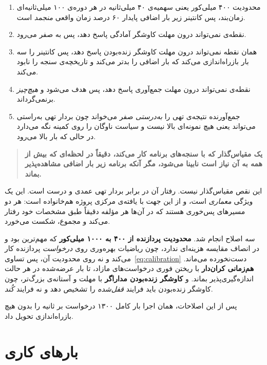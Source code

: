 \begin{enumerate}
  \item محدودیت ۴۰۰ میلی‌کور یعنی سهمیه‌ی ۴۰ میلی‌ثانیه در هر دوره‌ی ۱۰۰ میلی‌ثانیه‌ای
  زمان‌بند، پس کانتینر زیر بار اضافی پایدار ۶۰ درصد زمان واقعی \emph{منجمد} است.
  \item نقطه‌ی  نمی‌تواند درون مهلت کاوشگر آمادگی پاسخ دهد، پس
   به صفر می‌رود.
  \item همان نقطه نمی‌تواند درون مهلت کاوشگر زنده‌بودن پاسخ دهد، پس  کانتینر را
  سه بار بازراه‌اندازی می‌کند \mdash{} که بار اضافی را بدتر می‌کند و تاریخچه‌ی سنجه را نابود می‌کند.
  \item نقطه‌ی  نمی‌تواند درون مهلت جمع‌آوری پاسخ دهد، پس هدف  می‌شود و
   \emph{هیچ‌چیز} برنمی‌گرداند.
  \item جمع‌آورنده نتیجه‌ی تهی را \emph{به‌درستی} صفر می‌خواند \mdash{} چون بردار تهی به‌راستی
  می‌تواند یعنی هیچ نمونه‌ای بالا نیست \mdash{} و سیاست ناوگان را روی کمینه نگه می‌دارد در حالی که
  بار بالا می‌رود.
\end{enumerate}

\begin{quote}
\textbf{یک مقیاس‌گذار که با سنجه‌های برنامه کار می‌کند، دقیقاً در لحظه‌ای که بیش از همه به آن
نیاز است نابینا می‌شود، مگر آنکه برنامه زیر بار اضافی مشاهده‌پذیر بماند.}
\end{quote}

این نقص مقیاس‌گذار نیست. رفتار آن در برابر بردار تهی عمدی و درست است. این یک ویژگی
\emph{معماری} است، و از این جهت با یافته‌ی مرکزی پروژه هم‌خانواده است: هر دو مسیرهای پس‌خوری
هستند که در آن‌ها هر مؤلفه دقیقاً طبق مشخصات خود رفتار می‌کند و مجموع، شکست می‌خورد.

سه اصلاح انجام شد. \textbf{محدودیت پردازنده از ۴۰۰ به ۱۰۰۰ میلی‌کور} \mdash{} که مهم‌ترین بود و در
انصاف مقایسه هزینه‌ای ندارد، چون ریاضیات بهره‌وری  روی \emph{درخواست} پردازنده کار
می‌کند و نه روی محدودیت آن، پس تساوی~\ref{eq:calibration} دست‌نخورده می‌ماند.
\textbf{هم‌زمانی کران‌دار} با ریختن فوری درخواست‌های مازاد، تا بار عرضه‌شده در هر حالت
اندازه‌گیری‌پذیر بماند. و \textbf{کاوشگر زنده‌بودن مداراگر} با مهلت و آستانه‌ی بزرگ‌تر، چون
کاوشگر زنده‌بودن باید فرایند \emph{قفل‌شده} را تشخیص دهد و نه فرایند \emph{کُند}.

پس از این اصلاحات، همان اجرا بار کامل ۱۳۰۰ درخواست بر ثانیه را بدون هیچ بازراه‌اندازی تحویل
داد.

\section{بارهای کاری}
\label{sec:method-workloads}

